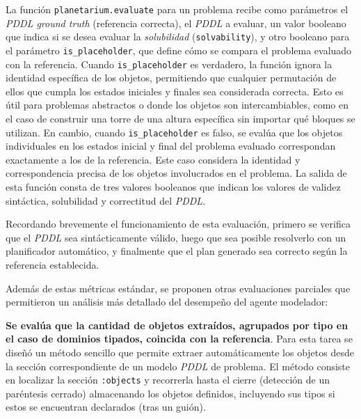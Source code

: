 La función \texttt{planetarium.evaluate} para un problema recibe como parámetros el \textit{PDDL ground truth} (referencia correcta), el \textit{PDDL} a evaluar, un valor booleano que indica si se desea evaluar la \textit{solubilidad} (\texttt{solvability}), y otro booleano para el parámetro \texttt{is\_placeholder}, que define cómo se compara el problema evaluado con la referencia. Cuando \texttt{is\_placeholder} es verdadero, la función ignora la identidad específica de los objetos, permitiendo que cualquier permutación de ellos que cumpla los estados iniciales y finales sea considerada correcta. Esto es útil para problemas abstractos o donde los objetos son intercambiables, como en el caso de construir una torre de una altura específica sin importar qué bloques se utilizan. En cambio, cuando \texttt{is\_placeholder} es falso, se evalúa que los objetos individuales en los estados inicial y final del problema evaluado correspondan exactamente a los de la referencia. Este caso considera la identidad y correspondencia precisa de los objetos involucrados en el problema. La salida de esta función consta de tres valores booleanos que indican los valores de validez sintáctica, solubilidad y correctitud del \textit{PDDL}.

Recordando brevemente el funcionamiento de esta evaluación, primero se verifica que el \textit{PDDL} sea sintácticamente válido, luego que sea posible resolverlo con un planificador automático, y finalmente que el plan generado sea correcto según la referencia establecida.

Además de estas métricas estándar, se proponen otras evaluaciones parciales que permitieron un análisis más detallado del desempeño del agente modelador:

\textbf{Se evalúa que la cantidad de objetos extraídos, agrupados por tipo en el caso de dominios tipados, coincida con la referencia}. Para esta tarea se diseñó un método sencillo que permite extraer automáticamente los objetos desde la sección correspondiente de un modelo \textit{PDDL} de problema. El método consiste en localizar la sección \texttt{:objects} y recorrerla hasta el cierre (detección de un paréntesis cerrado) almacenando los objetos definidos, incluyendo sus tipos si estos se encuentran declarados (tras un guión).

